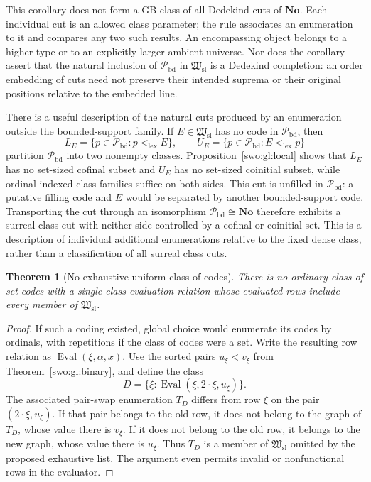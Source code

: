 \documentclass[11pt]{article}
\newtheorem{theorem}{Theorem}[section]
\theoremstyle{definition}
\theoremstyle{remark}
\newcommand{\No}{\mathbf{No}}
\newcommand{\Hsl}{\mathfrak W_{\mathrm{sl}}}
\newcommand{\Pbd}{\mathcal P_{\mathrm{bd}}}
\newcommand{\lex}{\mathrm{lex}}
\begin{document}
This corollary does not form a GB class of all Dedekind cuts of $\No$.
Each individual cut is an allowed class parameter; the rule associates an
enumeration to it and compares any two such results.  An encompassing object
belongs to a higher type or to an explicitly larger ambient universe.  Nor
does the corollary assert that the natural inclusion of $\Pbd$ in $\Hsl$
is a Dedekind completion: an order embedding of cuts need not preserve their
intended suprema or their original positions relative to the embedded line.

There is a useful description of the natural cuts produced by an enumeration
outside the bounded-support family.  If $E\in\Hsl$ has no code in $\Pbd$,
then
\[
 L_E=\{p\in\Pbd:p<_{\lex}E\},\qquad
 U_E=\{p\in\Pbd:E<_{\lex}p\}
\]
partition $\Pbd$ into two nonempty classes.  Proposition~\ref{swo:gl:local}
shows that $L_E$ has no set-sized cofinal subset and $U_E$ has no set-sized
coinitial subset, while ordinal-indexed class families suffice on both
sides.  This cut is unfilled in $\Pbd$: a putative filling code and $E$
would be separated by another bounded-support code.  Transporting the cut
through an isomorphism $\Pbd\cong\No$ therefore exhibits a surreal class
cut with neither side controlled by a cofinal or coinitial set.  This is a
description of individual additional enumerations relative to the fixed
dense class, rather than a classification of all surreal class cuts.

\begin{theorem}[No exhaustive uniform class of codes]\label{swo:gl:diagonal}
There is no ordinary class of set codes with a single class evaluation
relation whose evaluated rows include every member of $\Hsl$.
\end{theorem}

\begin{proof}
If such a coding existed, global choice would enumerate its codes by
ordinals, with repetitions if the class of codes were a set.  Write the
resulting row relation as $\operatorname{Eval}(\xi,\alpha,x)$.
Use the sorted pairs $u_\xi<v_\xi$ from Theorem~\ref{swo:gl:binary},
and define the class
\[
 D=\{\xi:\operatorname{Eval}(\xi,2\cdot\xi,u_\xi)\}.
\]
The associated pair-swap enumeration $T_D$ differs from row $\xi$
on the pair $(2\cdot\xi,u_\xi)$.  If that pair belongs to the old row,
it does not belong to the graph of $T_D$, whose value there is
$v_\xi$.  If it does not belong to the old row, it belongs to the
new graph, whose value there is $u_\xi$.
Thus $T_D$ is a member of $\Hsl$ omitted by the proposed exhaustive list.
The argument even permits invalid or nonfunctional rows in the evaluator.
\end{proof}
\end{document}
